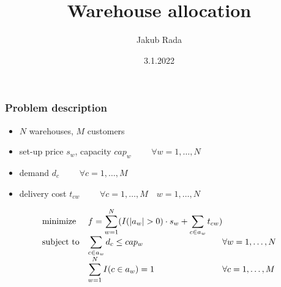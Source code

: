 \documentclass{beamer}
\title{Warehouse allocation}
\author{Jakub Rada}
\date{3.1.2022}
\begin{document}
\begin{frame}
    \titlepage
\end{frame}

\begin{frame}
    \frametitle{Problem description}

    \begin{itemize}
        \item $N$ warehouses, $M$ customers
        \item set-up price $s_w$, capacity $cap_w$ $\qquad \forall w = 1, \dots, N$
        \item demand $d_c$ $\qquad \forall c = 1, \dots, M$
        \item delivery cost $t_{cw}$ $\qquad \forall c = 1, \dots, M \quad w = 1, \dots, N$
    \end{itemize}

    \begin{equation*}
        \begin{array}{ll @{} ll}
            \text{minimize}   & f = \displaystyle\sum_{w = 1}^{N}(I(|a_w| > 0) \cdot s_w + \sum_{c \in a_w} t_{cw}) & \\
            \text{subject to} & \displaystyle\sum_{c \in a_w} d_c \leq cap_w & \forall w = 1, \dots, N \\
                              & \displaystyle\sum_{w = 1}^{N} I(c \in a_w) = 1 & \forall c = 1, \dots, M \\
        \end{array}
    \end{equation*}
\end{frame}
\end{document}
